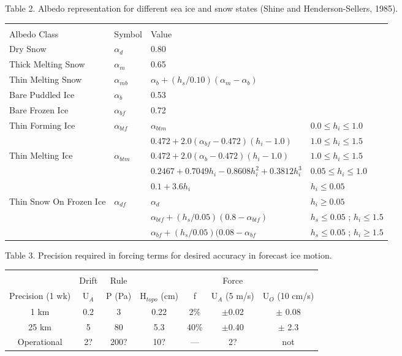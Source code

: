 \pagebreak
\begin{center}
Table 2.  Albedo representation for different sea ice and snow states
\linebreak 
(Shine and Henderson-Sellers, 1985).

\begin{tabular}{llll}
&&&\\
Albedo Class    & Symbol &    Value\\
\hline
\hline

Dry Snow        &   $ \alpha_d  $ &    0.80\\
Thick Melting Snow& $ \alpha_m  $ &    0.65\\
Thin Melting Snow&  $\alpha_{mb}$ &  $\alpha_b + (h_s/0.10)
                                   (\alpha_m-\alpha_b)$ \\
Bare Puddled Ice&   $\alpha_b  $   &    0.53 \\
Bare Frozen Ice &   $\alpha_{bf}$  &    0.72 \\

Thin Forming Ice &  $\alpha_{btf}$ &  
 $\alpha_{btm}$ & $0.0 \leq h_i \leq 1.0$ \\
& & $0.472 + 2.0(\alpha_{bf} - 0.472)(h_i -1.0)$ 
& $1.0 \leq h_i \leq 1.5$ 
\\

Thin Melting Ice &  $\alpha_{btm}$ &
$0.472 + 2.0(\alpha_b-0.472)(h_i-1.0)$ & 
    $ 1.0 \leq h_i \leq 1.5 $ \\
& & $0.2467 + 0.7049 h_i - 0.8608 h_i^2 + 0.3812 h_i^3$ &
    $ 0.05 \leq h_i \leq 1.0$  \\
& & $ 0.1 + 3.6 h_i$ & $h_i \leq 0.05$ \\

Thin Snow On Frozen Ice&  $ \alpha_{df}$ &
$\alpha_d$ & $h_i \geq 0.05$ \\
& & $\alpha_{btf} + (h_s / 0.05) (0.8 - \alpha_{btf} )$ & $h_s \leq 0.05$ ;
    $ h_i \leq 1.5$ \\
& & $\alpha_{bf} + (h_s / 0.05) (0.08 - \alpha_{bf}$ &$ h_s \leq 0.05 $ ;
    $ h_i \geq 1.5$ \\
\hline
\end{tabular}
\end{center}

\pagebreak
\begin{center}
Table 3.  Precision required in forcing terms for desired accuracy in
forecast ice motion.
\begin{tabular}{ccccccc}
&&&&&&\\
                 & Drift& Rule&      & & Force  \\
Precision (1 wk) & U$_A$ & P (Pa) &
      H$_{topo}$ (cm) & f & U$_{A}$ (5 m/s) & U$_{O}$ (10 cm/s) \\
\hline
\hline
1 km & 0.2 & 3 & 0.22 & 2\% & $\pm$0.02 & $\pm$ 0.08 \\
25 km & 5 & 80 & 5.3 & 40\% & $\pm$0.40 & $\pm$ 2.3 \\
Operational & 2? & 200? & 10? & --- & 2? & not \\
\hline
\end{tabular}
\end{center}

